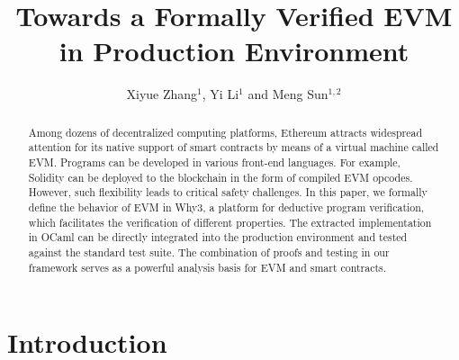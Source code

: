 \documentclass[runningheads]{llncs}
\begin{document}
\title{Towards a Formally Verified EVM in Production Environment}


\author{Xiyue Zhang$^1$,
Yi Li$^1$ and
Meng Sun$^{1,2}$
}


\maketitle              %

\begin{abstract}
Among dozens of decentralized computing platforms, Ethe\-reum attracts widespread attention for its native support of smart contracts by means of a virtual machine called EVM. Programs can be developed in various front-end languages. For example, Solidity can be deployed to the blockchain in the form of compiled EVM opcodes. However, such flexibility leads to critical safety challenges. In this paper, we formally define the behavior of EVM in Why3, a platform for deductive program verification, which facilitates the verification of different properties. The extracted implementation in OCaml can be directly integrated into the production environment and tested against the standard test suite. The combination of proofs and testing in our framework serves as a powerful analysis basis for EVM and smart contracts.
\end{abstract}




\section{Introduction}
\end{document}
